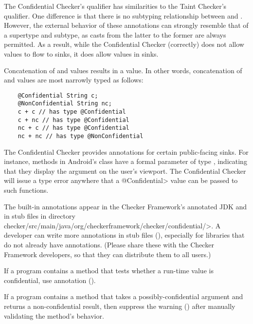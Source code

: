 The Confidential Checker's  qualifier has similarities
to the Taint Checker's  qualifier.  One difference is that
there is no subtyping relationship between  and
. However, the external behavior of these annotations
can strongly resemble that of a supertype and subtype, as casts from the
latter to the former are always permitted. As a result, while the
Confidential Checker (correctly) does not allow  values
to flow to  sinks, it does allow
 values in  sinks.


Concatenation of  and  values
results in a  value. In other words, concatenation of
 and  values are most narrowly typed
as follows:

\begin{Verbatim}
    @Confidential String c;
    @NonConfidential String nc;
    c + c // has type @Confidential
    c + nc // has type @Confidential
    nc + c // has type @Confidential
    nc + nc // has type @NonConfidential
\end{Verbatim}



The Confidential Checker provides annotations for certain public-facing
sinks.  For instance, methods in Android's  class have a
formal parameter of type , indicating
that they display the argument on the user's viewport.  The Confidential
Checker will issue a type error anywhere that a \<@Confidential> value can
be passed to such functions.

The built-in annotations appear in the Checker
Framework's annotated JDK and in stub files in directory
\<checker/\allowbreak src/\allowbreak main/\allowbreak java/\allowbreak org/\allowbreak checkerframework/\allowbreak checker/\allowbreak confidential/>.
A developer can write more annotations in stub files
(), especially for libraries that do not already have
annotations.  (Please share these with the Checker Framework developers, so
that they can distribute them to all users.)

If a program contains a method that tests whether a run-time value is
confidential, use annotation
 ().

If a program contains a method that takes a possibly-confidential argument
and returns a non-confidential result, then suppress the warning
() after manually validating the
method's behavior.
